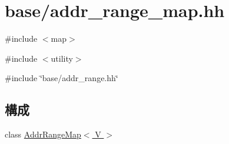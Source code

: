 \hypertarget{addr__range__map_8hh}{
\section{base/addr\_\-range\_\-map.hh}
\label{addr__range__map_8hh}
}
{\ttfamily \#include $<$map$>$}\par
{\ttfamily \#include $<$utility$>$}\par
{\ttfamily \#include \char`\"{}base/addr\_\-range.hh\char`\"{}}\par
\subsection*{構成}
\begin{DoxyCompactItemize}
\item 
class \hyperlink{classAddrRangeMap}{AddrRangeMap$<$ V $>$}
\end{DoxyCompactItemize}
